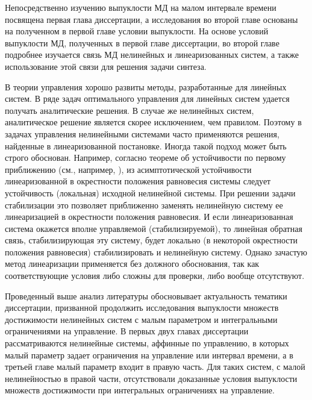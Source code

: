 \documentclass[../abstract.tex]{subfiles}
\begin{document}
Непосредственно изучению выпуклости МД на малом интервале времени посвящена первая глава диссертации, а исследования во второй главе основаны на полученном в первой главе условии выпуклости.
На основе условий выпуклости МД, полученных в первой главе диссертации, во второй главе подробнее изучается связь МД нелинейных и линеаризованных систем, а также использование этой связи для решения задачи синтеза. 

В теории управления хорошо развиты методы, разработанные для линейных систем. 
В ряде задач оптимального управления для линейных систем удается получать аналитические решения. 
В случае же нелинейных систем, аналитическое решение является скорее исключением, чем правилом. 
Поэтому в задачах управления нелинейными системами часто применяются решения, найденные в линеаризованной постановке. 
Иногда такой подход может быть строго обоснован. 
Например, согласно теореме об устойчивости по первому приближению (см., например, \cite{Barbashin_book}), из асимптотической устойчивости линеаризованной в окрестности положения равновесия системы следует устойчивость (локальная) исходной нелинейной системы. 
При решении задачи стабилизации это позволяет приближенно заменять нелинейную систему ее линеаризацией в окрестности положения равновесия. 
И если линеаризованная система окажется вполне управляемой (стабилизируемой), то линейная обратная связь, стабилизирующая эту систему, будет локально (в некоторой окрестности положения равновесия) стабилизировать и нелинейную систему\cite{Kras_add, Stab_lectures, Khalil, Polyak_book}. 
Однако зачастую метод линеаризации применяется без должного обоснования, так как соответствующие условия либо сложны для проверки, либо вообще отсутствуют.

Проведенный выше анализ литературы обосновывает актуальность тематики диссертации, призванной продолжить исследования выпуклости множеств достижимости нелинейных систем с малым параметром и интегральными ограничениями на управление. 
В первых двух главах диссертации рассматриваются нелинейные системы, аффинные по управлению, в которых малый параметр задает ограничения на управление или интервал времени, а в третьей главе малый параметр входит в правую часть. 
Для таких систем, с малой нелинейностью в правой части, отсутствовали доказанные условия выпуклости множеств достижимости при интегральных ограничениях на управление.
\end{document}
